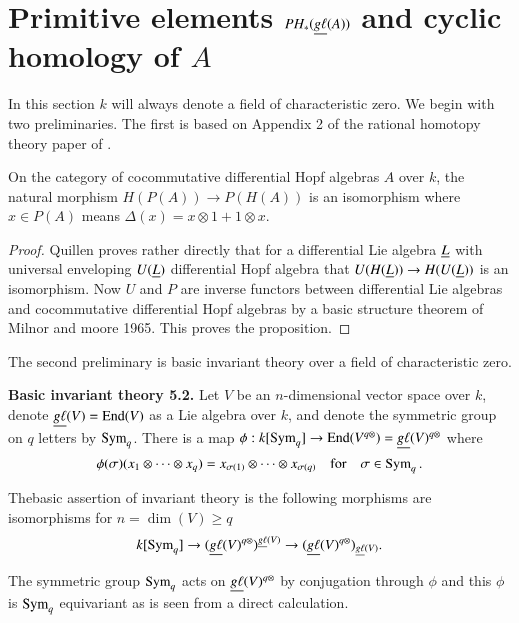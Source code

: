 \section{Primitive elements $PH_{\ast}(\protect\underline{g\ell}(A))$ and cyclic
  homology of $A$}\label{chap4-sec5}

In this section $k$ will always denote a field of characteristic
zero. We begin with two preliminaries. The first is based on Appendix
2 of the rational homotopy theory paper of \cite{Quillen1969}.

\begin{proposition}\label{chap4-prop5.1}
On the category of cocommutative differential Hopf algebras $A$ over
$k$, the natural morphism $H(P(A))\to P(H(A))$ is an isomorphism where
$x\in P(A)$ means $\Delta(x)=x\otimes 1+1\otimes x$.
\end{proposition}

\begin{proof}
Quillen proves rather directly that for a differential Lie algebra
$\underline{L}$ with universal enveloping $U(\underline{L})$ differential Hopf
algebra that $U(H(\ul{L}))\break\to H(U(\ul{L}))$ is an isomorphism. Now $U$
and $P$ are inverse functors between differential Lie algebras and
cocommutative differential Hopf algebras by a basic structure theorem
of Milnor and moore 1965. This proves the proposition.
\end{proof}

The second preliminary is basic invariant theory over a field of
characteristic zero.

\medskip
\noindent
{\bf Basic invariant theory 5.2.} Let $V$ be an $n$-dimensional vector
space over $k$, denote $\underline{g\ell}(V)=\operatorname{End}(V)$ as a Lie algebra over
$k$, and denote the symmetric group on $q$ letters by
$\operatorname{Sym}_{q}$. There is a map
$\phi:k[\operatorname{Sym}_{q}]\to \operatorname{End}(V^{q\otimes})=\underline{g\ell}(V)^{q\otimes}$
where
$$
\phi(\sigma)(x_{1}\otimes\cdots\otimes
x_{q})=x_{\sigma(1)}\otimes\cdots\otimes x_{\sigma(q)}\quad\text{for}\quad
\sigma\in \operatorname{Sym}_{q}. 
$$

The\pageoriginale basic assertion of invariant theory is the following
morphisms are isomorphisms for $n=\dim(V)\geq q$ 
$$
k[\operatorname{Sym}_{q}]\to (\underline{g\ell}(V)^{q\otimes})^{\underline{g\ell}(V)}\to
(\underline{g\ell}(V)^{q\otimes})_{\underline{g\ell}(V)}. 
$$

The symmetric group $\operatorname{Sym}_{q}$ acts on $\underline{g\ell}(V)^{q\otimes}$ by
conjugation through $\phi$ and this $\phi$ is $\operatorname{Sym}_{q}$ equivariant
as is seen from a direct calculation.

